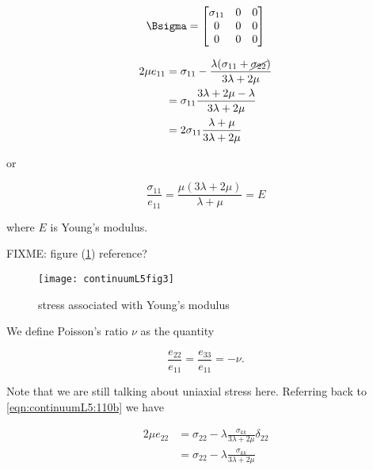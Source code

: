 \begin{equation}\label{eqn:continuumL5:n}
\Bsigma =
\begin{bmatrix}
\sigma_{11} & 0 & 0\\
0 & 0 & 0 \\
0 & 0 & 0
\end{bmatrix}
\end{equation}

\begin{align*}
2 \mu e_{11}
&= \sigma_{11} - \frac{\lambda ( \sigma_{11} + \cancel{\sigma_{22}} ) }{3 \lambda + 2 \mu} \\
&= \sigma_{11} \frac{3 \lambda + 2 \mu - \lambda }{3 \lambda + 2 \mu} \\
&= 2 \sigma_{11} \frac{\lambda + \mu }{3 \lambda + 2 \mu}
\end{align*}

or

\begin{equation}\label{eqn:continuumL5:n}
\frac{\sigma_{11}}{e_{11}} = \frac{\mu(3 \lambda + 2 \mu)}{\lambda + \mu } = E
\end{equation}

where $E$ is Young's modulus.

FIXME: figure (\ref{fig:continuumL5:continuumL5fig3}) reference?

\begin{figure}[htp]
   \centering
   \texttt{[image: continuumL5fig3]}
   \caption{stress associated with Young's modulus}\label{fig:continuumL5:continuumL5fig3}
\end{figure}

We define Poisson's ratio $\nu$ as the quantity

\begin{equation}\label{eqn:continuumL5:n}
\frac{e_{22}}{e_{11}} = \frac{e_{33}}{e_{11}} = - \nu.
\end{equation}

Note that we are still talking about uniaxial stress here.  Referring back to \ref{eqn:continuumL5:110b} we have

\begin{align*}
2 \mu e_{2 2}
&= \sigma_{2 2} - \lambda \frac{\sigma_{k k}}{3 \lambda + 2 \mu} \delta_{2 2} \\
&= \sigma_{2 2} - \lambda \frac{\sigma_{k k}}{3 \lambda + 2 \mu}
\end{align*}

